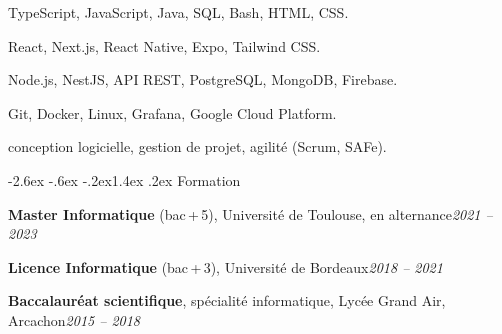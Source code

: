 \documentclass[10pt,a4paper]{article}
\makeatletter
\renewcommand\section{\@startsection{section}{1}{\z@}%
  {-2.6ex \@plus -.6ex \@minus -.2ex}{1.4ex \@plus .2ex}%
  {\normalfont\Large\bfseries}}
\newcommand{\entry}[2]{\par\noindent #1\hfill\textit{#2}\par}
\makeatother
\begin{document}
\begin{description}[itemsep=0pt, topsep=2pt, font=\normalfont\bfseries]
  \item[Langages :] TypeScript, JavaScript, Java, SQL, Bash, HTML, CSS.
  \item[Web et mobile :] React, Next.js, React Native, Expo, Tailwind CSS.
  \item[Serveur et données :] Node.js, NestJS, API REST, PostgreSQL, MongoDB,
        Firebase.
  \item[Outils :] Git, Docker, Linux, Grafana, Google Cloud Platform.
  \item[Méthodes :] conception logicielle, gestion de projet, agilité
        (Scrum, SAFe).
\end{description}

\section{Formation}

\entry{\textbf{Master Informatique} (bac\,+\,5), Université de Toulouse, en alternance}
      {2021 -- 2023}
\entry{\textbf{Licence Informatique} (bac\,+\,3), Université de Bordeaux}
      {2018 -- 2021}
\entry{\textbf{Baccalauréat scientifique}, spécialité informatique,
       Lycée Grand Air, Arcachon}
      {2015 -- 2018}
\end{document}
